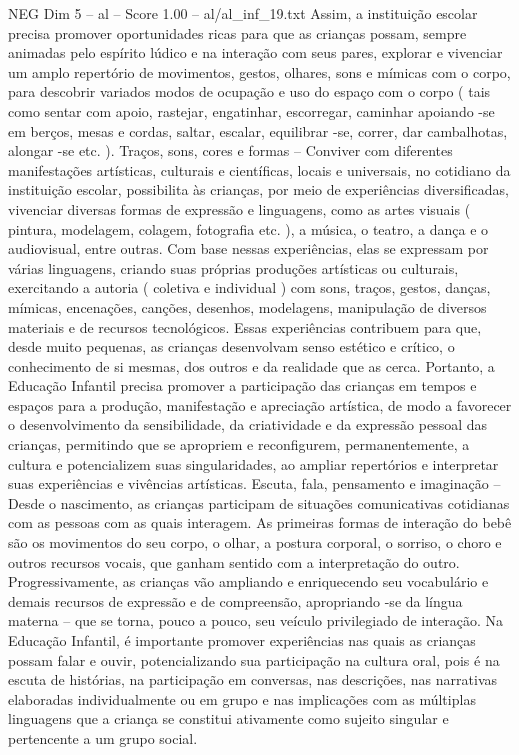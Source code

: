 \begin{textsample}{NEG Dim 5 – al – Score 1.00 – al/al\_inf\_19.txt}
Assim, a instituição escolar precisa promover oportunidades ricas para que as crianças possam, sempre animadas pelo espírito lúdico e na interação com seus pares, explorar e vivenciar um amplo repertório de movimentos, gestos, olhares, sons e mímicas com o corpo, para descobrir variados modos de ocupação e uso do espaço com o corpo ( tais como sentar com apoio, rastejar, engatinhar, escorregar, caminhar apoiando -se em berços, mesas e cordas, saltar, escalar, equilibrar -se, correr, dar cambalhotas, alongar -se etc. ).
Traços, sons, cores e formas – Conviver com diferentes manifestações artísticas, culturais e científicas, locais e universais, no cotidiano da instituição escolar, possibilita às crianças, por meio de experiências diversificadas, vivenciar diversas formas de expressão e linguagens, como as artes visuais ( pintura, modelagem, colagem, fotografia etc. ), a música, o teatro, a dança e o audiovisual, entre outras.
Com base nessas experiências, elas se expressam por várias linguagens, criando suas próprias produções artísticas ou culturais, exercitando a autoria ( coletiva e individual ) com sons, traços, gestos, danças, mímicas, encenações, canções, desenhos, modelagens, manipulação de diversos materiais e de recursos tecnológicos.
Essas experiências contribuem para que, desde muito pequenas, as crianças desenvolvam senso estético e crítico, o conhecimento de si mesmas, dos outros e da realidade que as cerca.
Portanto, a Educação Infantil precisa promover a participação das crianças em tempos e espaços para a produção, manifestação e apreciação artística, de modo a favorecer o desenvolvimento da sensibilidade, da criatividade e da expressão pessoal das crianças, permitindo que se apropriem e reconfigurem, permanentemente, a cultura e potencializem suas singularidades, ao ampliar repertórios e interpretar suas experiências e vivências artísticas.
Escuta, fala, pensamento e imaginação – Desde o nascimento, as crianças participam de situações comunicativas cotidianas com as pessoas com as quais interagem.
As primeiras formas de interação do bebê são os movimentos do seu corpo, o olhar, a postura corporal, o sorriso, o choro e outros recursos vocais, que ganham sentido com a interpretação do outro.
Progressivamente, as crianças vão ampliando e enriquecendo seu vocabulário e demais recursos de expressão e de compreensão, apropriando -se da língua materna – que se torna, pouco a pouco, seu veículo privilegiado de interação.
Na Educação Infantil, é importante promover experiências nas quais as crianças possam falar e ouvir, potencializando sua participação na cultura oral, pois é na escuta de histórias, na participação em conversas, nas descrições, nas narrativas elaboradas individualmente ou em grupo e nas implicações com as múltiplas linguagens que a criança se constitui ativamente como sujeito singular e pertencente a um grupo social.

\end{textsample}
